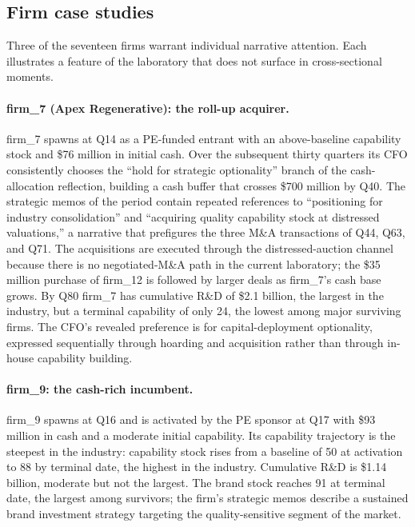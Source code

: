 \documentclass[11pt]{article}
\begin{document}
\subsection{Firm case studies}\label{sec:cases}

Three of the seventeen firms warrant individual narrative attention.
Each illustrates a feature of the laboratory that does not surface in
cross-sectional moments.

\paragraph{firm\_7 (Apex Regenerative): the roll-up acquirer.}
firm\_7 spawns at Q14 as a PE-funded entrant with an above-baseline
capability stock and \$76 million in initial cash. Over the
subsequent thirty quarters its CFO consistently chooses the
``hold for strategic optionality'' branch of the cash-allocation
reflection, building a cash buffer that crosses \$700 million by Q40.
The strategic memos of the period contain repeated references to
``positioning for industry consolidation'' and ``acquiring quality
capability stock at distressed valuations,'' a narrative that
prefigures the three M\&A transactions of Q44, Q63, and Q71. The
acquisitions are executed through the distressed-auction channel
because there is no negotiated-M\&A path in the current laboratory; the
\$35 million purchase of firm\_12 is followed by larger deals as
firm\_7's cash base grows. By Q80 firm\_7 has cumulative R\&D of
\$2.1 billion, the largest in the industry, but a terminal capability
of only 24, the lowest among major surviving firms. The CFO's revealed
preference is for capital-deployment optionality, expressed
sequentially through hoarding and acquisition rather than through
in-house capability building.

\paragraph{firm\_9: the cash-rich incumbent.}
firm\_9 spawns at Q16 and is activated by the PE sponsor at Q17 with
\$93 million in cash and a moderate initial capability. Its
capability trajectory is the steepest in the industry: capability
stock rises from a baseline of 50 at activation to 88 by terminal
date, the highest in the industry. Cumulative R\&D is \$1.14 billion,
moderate but not the largest. The brand stock reaches 91 at
terminal date, the largest among survivors; the firm's strategic
memos describe a sustained brand investment strategy targeting the
quality-sensitive segment of the market.
\end{document}
